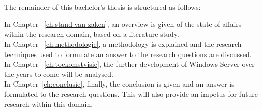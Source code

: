 \section{}
\label{sec:opzet-bachelorproef}

The remainder of this bachelor's thesis is structured as follows:

In Chapter ~\ref{ch:stand-van-zaken}, an overview is given of the state of affairs within the research domain, based on a literature study.
\\

In Chapter ~\ref{ch:methodologie}, a methodology is explained and the research techniques used to formulate an answer to the research questions are discussed.
\\

In Chapter ~\ref{ch:toekomstvisie}, the further development of Windows Server over the years to come will be analysed. 
\\

In Chapter~\ref{ch:conclusie}, finally, the conclusion is given and an answer is formulated to the research questions. This will also provide an impetus for future research within this domain.
\\
